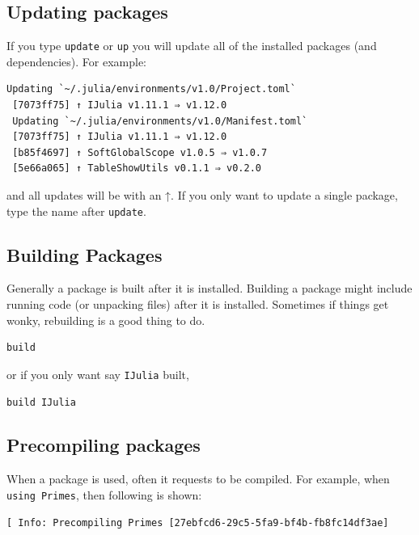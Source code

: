 \hypertarget{updating-packages}{%
\subsection{Updating packages}\label{updating-packages}}

If you type \texttt{update} or \texttt{up} you will update all of the
installed packages (and dependencies). For example:

\begin{verbatim}
Updating `~/.julia/environments/v1.0/Project.toml`
 [7073ff75] ↑ IJulia v1.11.1 ⇒ v1.12.0
 Updating `~/.julia/environments/v1.0/Manifest.toml`
 [7073ff75] ↑ IJulia v1.11.1 ⇒ v1.12.0
 [b85f4697] ↑ SoftGlobalScope v1.0.5 ⇒ v1.0.7
 [5e66a065] ↑ TableShowUtils v0.1.1 ⇒ v0.2.0
\end{verbatim}

and all updates will be with an ↑. If you only want to update a single
package, type the name after \texttt{update}.

\hypertarget{building-packages}{%
\subsection{Building Packages}\label{building-packages}}

Generally a package is built after it is installed. Building a package
might include running code (or unpacking files) after it is installed.
Sometimes if things get wonky, rebuilding is a good thing to do.

\begin{verbatim}
build
\end{verbatim}

or if you only want say \texttt{IJulia} built,

\begin{verbatim}
build IJulia
\end{verbatim}

\subsection{Precompiling packages}

When a package is used, often it requests to be compiled. For example,
when \texttt{using\ Primes}, then following is shown:

\begin{verbatim}
[ Info: Precompiling Primes [27ebfcd6-29c5-5fa9-bf4b-fb8fc14df3ae]
\end{verbatim}

